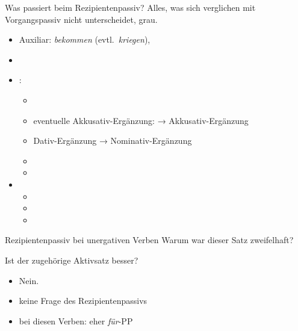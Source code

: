 \begin{frame}
  {Was passiert beim Rezipientenpassiv?}
  \pause
  Alles, was sich verglichen mit Vorgangspassiv nicht unterscheidet, grau.\\
  \Halbzeile
  \pause
  \begin{itemize}[<+->]
    \item Auxiliar: \textit{bekommen} (evtl.\ \textit{kriegen}), 
    \item {}
      \Halbzeile
    \item {}:
      \begin{itemize}[<+->]
        \item {}
        \item eventuelle Akkusativ-Ergänzung: → Akkusativ-Ergänzung
        \item \alert{Dativ-Ergänzung → Nominativ-Ergänzung}
        \item {}
        \item {}
      \end{itemize}
    \Halbzeile
  \item {}
    \begin{itemize}[<+->]
      \item {}
      \item {}
      \item {}
    \end{itemize}
  \end{itemize}
\end{frame}

\begin{frame}
  {Rezipientenpassiv bei unergativen Verben}
  \onslide<+->
  \onslide<+->
  Warum war dieser Satz zweifelhaft?\\
  \onslide<+->
  \begin{exe}
  \end{exe}
  \onslide<+->
  \Halbzeile
  Ist der zugehörige Aktivsatz besser?\\
  \onslide<+->
  \begin{exe}
  \end{exe}
  \begin{itemize}[<+->]
    \item Nein.
    \item \alert{keine Frage des Rezipientenpassivs}
    \item bei diesen Verben: eher \textit{für}-PP
  \end{itemize}
\end{frame}


